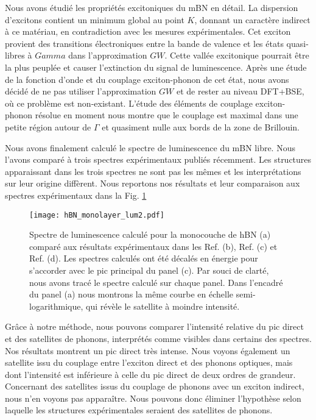 Nous avons étudié les propriétés excitoniques du mBN en détail. La dispersion d'excitons contient un minimum global au point $K$, donnant un caractère indirect à ce matériau, en contradiction avec les mesures expérimentales. Cet exciton provient des transitions électroniques entre la bande de valence et les états quasi-libres à $Gamma$ dans l'approximation $GW$. Cette vallée excitonique pourrait être la plus peuplée et causer l'extinction du signal de luminescence. Après une étude de la fonction d'onde et du couplage exciton-phonon de cet état, nous avons décidé de ne pas utiliser l'approximation $GW$ et de rester au niveau DFT+BSE, où ce problème est non-existant. L'étude des éléments de couplage exciton-phonon résolue en moment nous montre que le couplage est maximal dans une petite région autour de $\Gamma$ et quasiment nulle aux bords de la zone de Brillouin.

Nous avons finalement calculé le spectre de luminescence du mBN libre. Nous l'avons comparé à trois spectres expérimentaux publiés récemment. Les structures apparaissant dans les trois spectres ne sont pas les mêmes et les interprétations sur leur origine diffèrent. Nous reportons nos résultats et leur comparaison aux spectres expérimentaux dans la Fig. \ref{fig:mBN_PL_fr}
\begin{figure}[H]
	\vspace{0.2cm}
	\setcapindent{2em}
	\centering
	\texttt{[image: hBN\_monolayer\_lum2.pdf]}
	\caption{Spectre de luminescence calculé pour la monocouche de hBN (a) comparé aux résultats expérimentaux dans les Ref. \cite{elias2019direct}(b), Ref. \cite{rousseau2021monolayer}(c) et Ref. \cite{wang2022scalable}(d). Les spectres calculés ont été décalés en énergie pour s'accorder avec le pic principal du panel (c). Par souci de clarté, nous avons tracé le spectre calculé sur chaque panel. Dans l'encadré du panel (a) nous montrons la même courbe en échelle semi-logarithmique, qui révèle le satellite à moindre intensité.}
	\label{fig:mBN_PL_fr} 
\end{figure}

Grâce à notre méthode, nous pouvons comparer l'intensité relative du pic direct et des satellites de phonons, interprétés comme visibles dans certains des spectres. Nos résultats montrent un pic direct très intense. Nous voyons également un satellite issu du couplage entre l'exciton direct et des phonons optiques, mais dont l'intensité est inférieure à celle du pic direct de deux ordres de grandeur. Concernant des satellites issus du couplage de phonons avec un exciton indirect, nous n'en voyons pas apparaître. Nous pouvons donc éliminer l'hypothèse selon laquelle les structures expérimentales seraient des satellites de phonons. 

